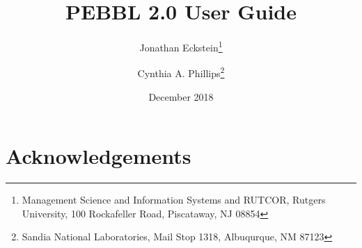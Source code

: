 \documentclass[12pt]{article}
\begin{document}
\title{
PEBBL 2.0 User Guide
}

\author{
Jonathan Eckstein\thanks{
Management Science and Information Systems and RUTCOR, Rutgers University,
100 Rockafeller Road, Piscataway, NJ 08854
}
\and
Cynthia A. Phillips\thanks{
Sandia National Laboratories, Mail Stop 1318, Albuqurque, NM 87123}
}

\date{December 2018}

\maketitle

\begin{abstract}

\end{abstract}

\newpage

\tableofcontents

\newpage



\section*{Acknowledgements}





\end{document}
